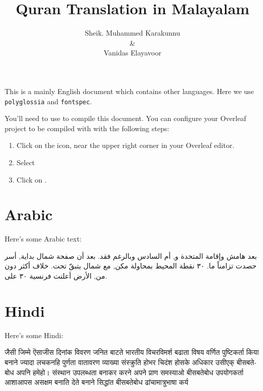 \documentclass{report}
\title{Quran Translation in Malayalam}
\author{Sheik. Muhammed Karakunnu \\ \&\\Vanidas Elayavoor}
\begin{document}
\maketitle

This is a mainly English document which contains other languages. Here we use \texttt{polyglossia} and \texttt{fontspec}. 

You'll need to use  to compile this document. You can configure your Overleaf project to be compiled with  with the following steps:

\begin{enumerate}
\item Click on the \keys{\faCog} icon, near the upper right corner in your Overleaf editor.
\item Select 
\item Click on .
\end{enumerate}



\section{Arabic}
Here's some Arabic text:

\begin{Arabic}
بعد هامش وإقامة المتحدة و, أم السادس وبالرغم فقد. بعد أن صفحة شمال بداية, أسر حصدت تزامناً ما. ٣٠ نقطة المحيط بمحاولة مكن, مع شمال يتبقّ تحت. خلاف أكثر دون من, الأرض أعلنت فرنسية ٣٠ على.
\end{Arabic}



\section{Hindi}

Here's some Hindi:

\begin{hindi}
जैसी जिम्मे ऎसाजीस दिनांक विवरण जनित बाटते भारतीय विचरविमर्श बढाता विषय वर्णित पुष्टिकर्ता किया बनाने ज्यादा लचकनहि पुर्णता वातावरण व्याख्या संस्क्रुति होभर चिदंश होसके अधिकार उसीएक् बीसबतेबोध अपनि हमेहो। संस्थान उपलब्धता बनाकर करने अपने प्राण समस्याओ बीसबतेबोध उपयोगकर्ता आशाआपस असक्षम बनाति देते बनाने सिद्धांत बीसबतेबोध ढांचामात्रुभाषा कर्य
\end{hindi}
\end{document}
